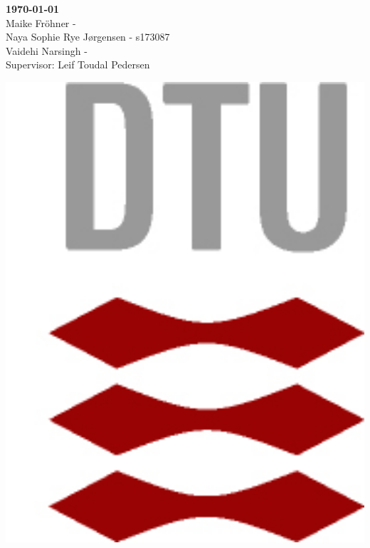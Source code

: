 \documentclass[11pt, a4paper]{article}
\begin{document}
\begin{titlepage}
	
	
	\begin{minipage}{0.5\textwidth}
		\begin{flushleft}
			\textbf{\today} \\
			\vspace{0.1cm} 
			Maike Fröhner - \\
			Naya Sophie Rye Jørgensen - s173087 \\
			Vaidehi Narsingh -  \\
			\vspace{0.1cm}
			Supervisor: Leif Toudal Pedersen
			
			
			
		\end{flushleft}
	\end{minipage}
	\hfill
	\begin{minipage}{0.1\textwidth}
		\begin{flushright}
			\includegraphics[width=1\textwidth]{DTU_logo1.png}
		\end{flushright}
	\end{minipage}\\	%
	

\end{titlepage}
\end{document}
